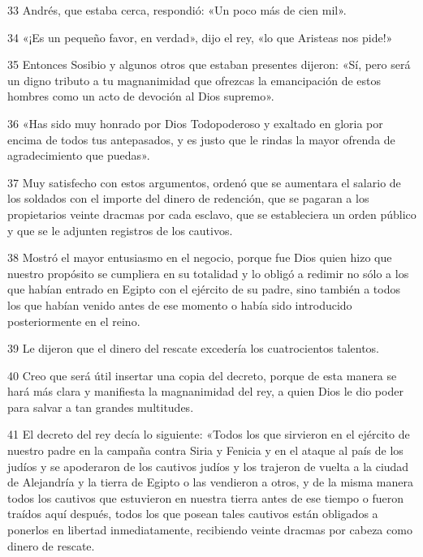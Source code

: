 \par 33 Andrés, que estaba cerca, respondió: «Un poco más de cien mil».

\par 34 «¡Es un pequeño favor, en verdad», dijo el rey, «lo que Aristeas nos pide!»

\par 35 Entonces Sosibio y algunos otros que estaban presentes dijeron: «Sí, pero será un digno tributo a tu magnanimidad que ofrezcas la emancipación de estos hombres como un acto de devoción al Dios supremo».

\par 36 «Has sido muy honrado por Dios Todopoderoso y exaltado en gloria por encima de todos tus antepasados, y es justo que le rindas la mayor ofrenda de agradecimiento que puedas».

\par 37 Muy satisfecho con estos argumentos, ordenó que se aumentara el salario de los soldados con el importe del dinero de redención, que se pagaran a los propietarios veinte dracmas por cada esclavo, que se estableciera un orden público y que se le adjunten registros de los cautivos.

\par 38 Mostró el mayor entusiasmo en el negocio, porque fue Dios quien hizo que nuestro propósito se cumpliera en su totalidad y lo obligó a redimir no sólo a los que habían entrado en Egipto con el ejército de su padre, sino también a todos los que habían venido antes de ese momento o había sido introducido posteriormente en el reino.

\par 39 Le dijeron que el dinero del rescate excedería los cuatrocientos talentos.

\par 40 Creo que será útil insertar una copia del decreto, porque de esta manera se hará más clara y manifiesta la magnanimidad del rey, a quien Dios le dio poder para salvar a tan grandes multitudes.

\par 41 El decreto del rey decía lo siguiente: «Todos los que sirvieron en el ejército de nuestro padre en la campaña contra Siria y Fenicia y en el ataque al país de los judíos y se apoderaron de los cautivos judíos y los trajeron de vuelta a la ciudad de Alejandría y la tierra de Egipto o las vendieron a otros, y de la misma manera todos los cautivos que estuvieron en nuestra tierra antes de ese tiempo o fueron traídos aquí después, todos los que posean tales cautivos están obligados a ponerlos en libertad inmediatamente, recibiendo veinte dracmas por cabeza como dinero de rescate.

